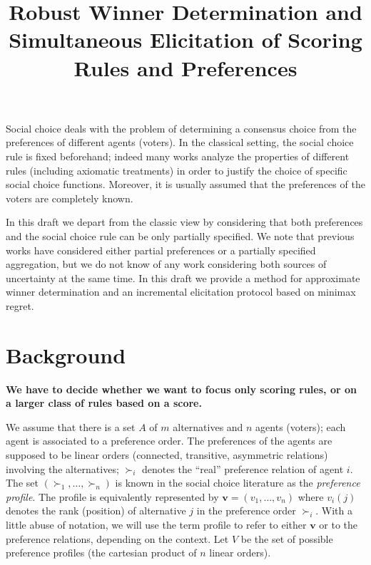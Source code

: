 \documentclass[12pt]{article}
\title{Robust Winner Determination and Simultaneous Elicitation of Scoring Rules and Preferences}
\newcommand{\pref}{{\succ}}%
\newcommand{\profile}{\textbf{v}}%
\begin{document}
\maketitle

Social choice deals with the problem of determining a consensus choice from the preferences of different agents (voters).
In the classical setting, the social choice rule is fixed beforehand; indeed many works analyze the properties of different rules (including axiomatic treatments) in order to justify the choice of specific social choice functions. 
Moreover, it is usually assumed that the preferences of the voters are completely known. 

In this draft we depart from the classic view by considering that both preferences and the social choice rule can be only partially specified.
We note that previous works have considered either partial preferences or a partially specified aggregation, but we do not know of any work considering both sources of uncertainty at the same time.
In this draft we provide a method for approximate winner determination and an incremental elicitation protocol based on minimax regret. 


\section{Background}

{\bf We have to decide whether we want to focus only scoring rules, or on a larger class of rules based on a score.}


We assume that there is a set $A$ of $m$ alternatives and $n$ agents (voters); each agent is associated to a preference order.
The preferences of the agents are supposed to be linear orders (connected, transitive, asymmetric relations) involving the alternatives;
$\pref_i$ denotes the ``real'' preference relation of agent $i$. 
The set $(\pref_1,\ldots,\pref_n)$ is known in the social choice literature as the {\em preference  profile}.
The profile is equivalently represented by $\profile=(v_1,\ldots,v_n)$ where $v_i(j)$ denotes the rank (position) of alternative $j$ in the preference order $\pref_i$. 
With a little abuse of notation, we will use the term profile to refer to either $\profile$ or to the preference relations, depending on the context.
Let $V$ be the set of possible preference profiles (the cartesian product of $n$ linear orders).
\end{document}
